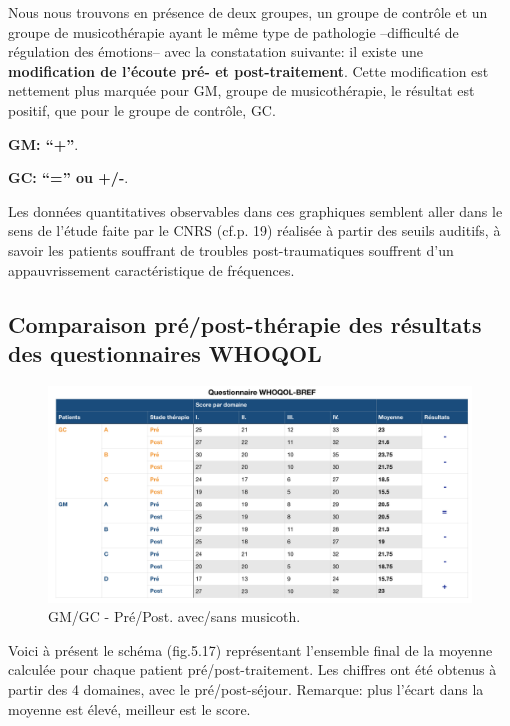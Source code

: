              Nous nous trouvons
           en présence de deux groupes, un groupe de contrôle et un
           groupe de musicothérapie ayant le même type de
           pathologie --difficulté de régulation des émotions-- avec la constatation suivante: il existe 
          une \textbf{modification de l'écoute pré- et post-traitement}.
          Cette modification est nettement plus marquée
          pour GM, groupe de musicothérapie, le résultat est positif, que pour le groupe de contrôle, GC.

          \textbf{GM: ``+''}.

          
          \textbf{GC:  ``='' ou +/-}.

          
        Les données quantitatives observables dans ces graphiques semblent aller dans le
sens de  l'étude faite par le
CNRS (cf.p. 19) réalisée à partir des seuils auditifs, à savoir
les patients souffrant de troubles post-traumatiques souffrent d'un
appauvrissement caractéristique de fréquences.


\subsection{ Comparaison pré/post-thérapie des résultats des
  questionnaires WHOQOL}

\begin{figure}[tbh]
\centering
\includegraphics[width=1.2\linewidth]{images/graphiques/questionnaire_wq.png}
\caption[Questionnaire WHOQOL-BREF]{GM/GC - Pré/Post. avec/sans musicoth.}
       
\label{groupecontroleimage1}
\end{figure}
Voici à présent le schéma (fig.5.17) représentant l'ensemble final de la
moyenne calculée pour chaque patient pré/post-traitement. 
Les chiffres ont été obtenus à partir des 4
domaines, avec le pré/post-séjour.
Remarque: plus l'écart dans la moyenne est élevé, meilleur est le score.


